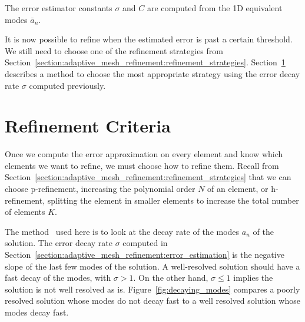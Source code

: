 \noindent
The error estimator constants \(\sigma \) and \(C\) are computed from the 1D equivalent modes
\(\overline{a}_n\).

It is now possible to refine when the estimated error is past a certain threshold. We still need to
choose one of the refinement strategies from
Section~\ref{section:adaptive_mesh_refinement:refinement_strategies}.
Section~\ref{section:adaptive_mesh_refinement:refinement_criteria} describes a method to choose the
most appropriate strategy using the error decay rate \(\sigma \) computed previously.

\section{Refinement Criteria}\label{section:adaptive_mesh_refinement:refinement_criteria}

Once we compute the error approximation on every element and know which elements we want to refine,
we must choose how to refine them. Recall from
Section~\ref{section:adaptive_mesh_refinement:refinement_strategies} that we can choose
p-refinement, increasing the polynomial order \(N\) of an element, or h-refinement, splitting the
element in smaller elements to increase the total number of elements \(K\).

The method~\cite{Mavriplis1990} used here is to look at the decay rate of the modes \(a_n\) of the
solution. The error decay rate \(\sigma \) computed in
Section~\ref{section:adaptive_mesh_refinement:error_estimation} is the negative slope of the last
few modes of the solution. A well-resolved solution should have a fast decay of the modes, with
\(\sigma > 1\). On the other hand, \(\sigma \leqslant 1\) implies the solution is not well resolved
as is. Figure~\ref{fig:decaying_modes} compares a poorly resolved solution whose modes do not decay
fast to a well resolved solution whose modes decay fast.

